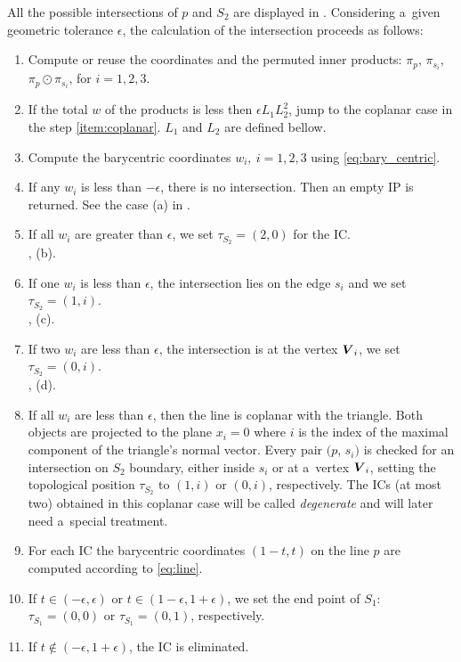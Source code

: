 All the possible intersections of $p$ and $S_2$ are displayed in .
Considering a~given geometric tolerance $\epsilon$,  the calculation of the intersection proceeds as follows:
\begin{enumerate}
    \item Compute or reuse the \plucker coordinates and the permuted inner products: $\pi_p$, $\pi_{s_i}$, $\pi_p \odot \pi_{s_i}$, for $i=1,2,3$.
    \item \label{item:zero_total} If the total $w$ of the products is less then $\epsilon L_1 L_2^2$, jump to the coplanar case in the step \ref{item:coplanar}.
          $L_1$ and $L_2$ are defined bellow.
    \item Compute the barycentric coordinates $w_i,\ i=1,2,3$ using \eqref{eq:bary_centric}.
    \item If any $w_i$ is less than $-\epsilon$, there is no intersection. Then an empty IP is returned. See the case (a) in .          
    \item If all $w_i$ are greater than $\epsilon$, we set $\tau_{S_2} = (2, 0)$ for the IC. \\
        , (b).
    \item If one $w_i$ is less than $\epsilon$, the intersection lies on the edge $s_i$ and we set $\tau_{S_2} =(1,i)$. \\
        , (c).
    \item If two $w_i$ are less than $\epsilon$, the intersection is at the vertex $\mathbf{\boldsymbol{V}}_i$, we set $\tau_{S_2}=(0,i)$. \\
        , (d).
    \item \label{item:coplanar} If all $w_i$ are less than $\epsilon$, then the line is coplanar with the triangle. Both objects are 
        projected to the plane $x_i=0$ where $i$ is the index of the maximal component of the triangle's normal vector.
        Every pair $(p$, $s_i)$ is checked for an intersection on $S_2$ boundary, either inside $s_i$ or at a~vertex $\mathbf{\boldsymbol{V}}_i$, 
        setting the topological position $\tau_{S_2}$ to 
        $(1, i)$ or $(0, i)$, respectively. The ICs (at most two) obtained in this coplanar case will be called 
        \emph{degenerate} and will later need a~special treatment.
    \item For each IC the barycentric coordinates $(1-t, t)$ on the line $p$ are computed according to \eqref{eq:line}. 
    \item \label{item:ic_snap} If $t\in (-\epsilon, \epsilon)$ or $t\in (1-\epsilon, 1+\epsilon)$,
        we set the end point of $S_1$: $\tau_{S_1} = (0,0)$ or $\tau_{S_1} = (0,1)$, respectively.
    \item \label{item:ic_elimination} If $t\notin (-\epsilon, 1+\epsilon)$, the IC is eliminated.
\end{enumerate}

